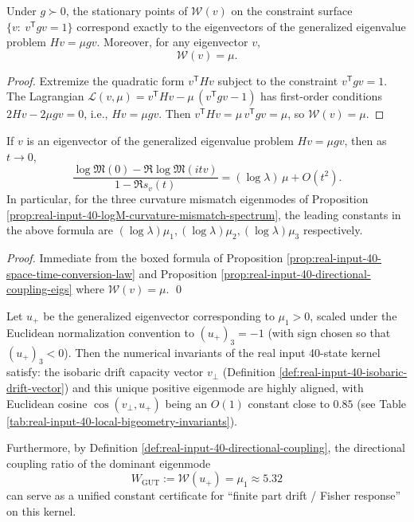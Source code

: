 \begin{proposition}\label{prop:real-input-40-directional-coupling-eigs}
Under \(g\succ 0\), the stationary points of \(\mathcal{W}(v)\) on the constraint surface \(\{v:\ v^{\mathsf T}gv=1\}\) correspond exactly to the eigenvectors of the generalized eigenvalue problem \(Hv=\mu gv\).
Moreover, for any eigenvector \(v\),
\[
\mathcal{W}(v)=\mu.
\]
\end{proposition}
\begin{proof}
Extremize the quadratic form \(v^{\mathsf T}Hv\) subject to the constraint \(v^{\mathsf T}gv=1\).
The Lagrangian
\(
\mathcal{L}(v,\mu)=v^{\mathsf T}Hv-\mu\,(v^{\mathsf T}gv-1)
\)
has first-order conditions \(2Hv-2\mu gv=0\), i.e., \(Hv=\mu gv\).
Then \(v^{\mathsf T}Hv=\mu\,v^{\mathsf T}gv=\mu\), so \(\mathcal{W}(v)=\mu\).
\end{proof}

\begin{corollary}\label{cor:real-input-40-space-time-conversion-eigmodes}
If \(v\) is an eigenvector of the generalized eigenvalue problem \(Hv=\mu gv\), then as \(t\to 0\),
\[
\frac{\log\mathfrak{M}(0)-\Re\log\mathfrak{M}(itv)}{1-\Re s_v(t)}
=(\log\lambda)\,\mu+O(t^2).
\]
In particular, for the three curvature mismatch eigenmodes of Proposition \ref{prop:real-input-40-logM-curvature-mismatch-spectrum}, the leading constants in the above formula are \((\log\lambda)\mu_1,(\log\lambda)\mu_2,(\log\lambda)\mu_3\) respectively.
\end{corollary}
\begin{proof}
Immediate from the boxed formula of Proposition \ref{prop:real-input-40-space-time-conversion-law} and Proposition \ref{prop:real-input-40-directional-coupling-eigs} where \(\mathcal{W}(v)=\mu\). \qed
\end{proof}

\begin{proposition}\label{prop:real-input-40-unified-generator-alignment}
Let \(u_+\) be the generalized eigenvector corresponding to \(\mu_1>0\), scaled under the Euclidean normalization convention to \((u_+)_3=-1\) (with sign chosen so that \((u_+)_3<0\)).
Then the numerical invariants of the real input 40-state kernel satisfy: the isobaric drift capacity vector \(v_\perp\) (Definition \ref{def:real-input-40-isobaric-drift-vector}) and this unique positive eigenmode are highly aligned,
with Euclidean cosine \(\cos(v_\perp,u_+)\) being an \(O(1)\) constant close to \(0.85\) (see Table \ref{tab:real-input-40-local-bigeometry-invariants}).
\par
Furthermore, by Definition \ref{def:real-input-40-directional-coupling}, the directional coupling ratio of the dominant eigenmode
\[
W_{\mathrm{GUT}}:=\mathcal{W}(u_+)=\mu_1\approx 5.32
\]
can serve as a unified constant certificate for ``finite part drift / Fisher response'' on this kernel.
\end{proposition}

